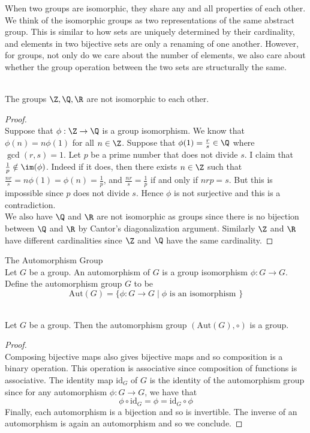 \documentclass[a4paper]{article}
\begin{document}
When two groups are isomorphic, they share any and all properties of each other. We think of the isomorphic groups as two representations of the same abstract group. This is similar to how sets are uniquely determined by their cardinality, and elements in two bijective sets are only a renaming of one another. However, for groups, not only do we care about the number of elements, we also care about whether the group operation between the two sets are structurally the same. 

\begin{eg}{}{}\\
The groups $\Z,\Q,\R$ are not isomorphic to each other. 
\begin{proof}\\
Suppose that $\phi:\Z\to\Q$ is a group isomorphism. We know that $\phi(n)=n\phi(1)$ for all $n\in\Z$. Suppose that $\phi(1)=\frac{r}{s}\in\Q$ where $\gcd(r,s)=1$. Let $p$ be a prime number that does not divide $s$. I claim that $\frac{1}{p}\notin\im(\phi)$. Indeed if it does, then there exists $n\in\Z$ such that $\frac{nr}{s}=n\phi(1)=\phi(n)=\frac{1}{p}$, and $\frac{nr}{s}=\frac{1}{p}$ if and only if $nrp=s$. But this is impossible since $p$ does not divide $s$. Hence $\phi$ is not surjective and this is a contradiction. \\
We also have $\Q$ and $\R$ are not isomorphic as groups since there is no bijection between $\Q$ and $\R$ by Cantor's diagonalization argument. Similarly $\Z$ and $\R$ have different cardinalities since $\Z$ and $\Q$ have the same cardinality. 
\end{proof}
\end{eg}

\begin{defn}{The Automorphism Group}{}\\
Let $G$ be a group. An automorphism of $G$ is a group isomorphism $\phi:G\to G$. Define the automorphism group $G$ to be $$\text{Aut}(G)=\{\phi:G\to G\;|\;\phi\text{ is an isomorphism }\}$$
\end{defn}

\begin{lmm}{}{}\\
Let $G$ be a group. Then the automorphism group $(\text{Aut}(G),\circ)$ is a group. 
\begin{proof}\\
Composing bijective maps also gives bijective maps and so composition is a binary operation. This operation is associative since composition of functions is associative. The identity map $\text{id}_G$ of $G$ is the identity of the automorphism group since for any automorphism $\phi:G\to G$, we have that $$\phi\circ\text{id}_G=\phi=\text{id}_G\circ\phi$$ Finally, each automorphism is a bijection and so is invertible. The inverse of an automorphism is again an automorphism and so we conclude. 
\end{proof}
\end{lmm}
\end{document}
